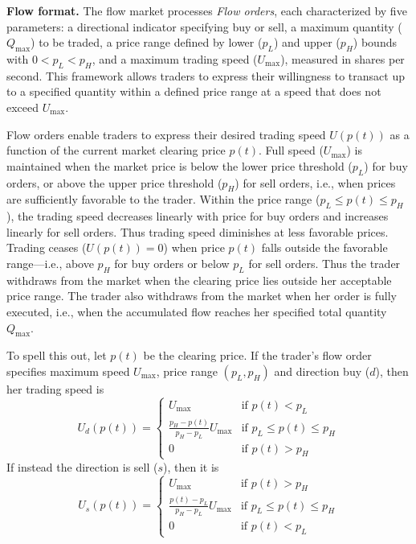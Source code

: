 \documentclass[12pt]{article}
\begin{document}
\bigskip
\noindent
\textbf{Flow format.}
The flow market processes  \textit{Flow orders}, %
each characterized by five parameters: a directional indicator specifying buy or sell, a maximum quantity (\(Q_{\max}\)) to be traded, a price range defined by lower (\(p_L\)) and upper (\(p_H\)) bounds with \(0<p_L < p_H\), and a maximum trading speed (\(U_{\max}\)), measured in shares per second. This framework allows traders to express their willingness to transact up to a specified quantity within a defined price range at a speed that does not exceed \(U_{\max}\).

Flow orders enable traders to express their desired trading speed \(U(p(t))\)  as a function of the current market clearing price \(p(t)\). 
Full speed (\(U_{\max}\)) is maintained when the market price is below the lower price threshold (\(p_L\)) for buy orders, or above the upper price threshold (\(p_H\)) for sell orders, i.e., when prices are sufficiently favorable to the trader.
Within the price range (\(p_L \leq p(t) \leq p_H\)), the trading speed decreases linearly with price for buy orders and increases linearly for sell orders. Thus trading speed diminishes at less favorable prices. 
Trading ceases (\(U(p(t)) = 0\)) when price $p(t)$ falls outside the favorable range—i.e., above \(p_H\) for buy orders or below \(p_L\) for sell orders. Thus the trader withdraws from the market when the clearing price lies outside her acceptable price range. 
The trader also withdraws from the market when her order is fully executed, i.e., when the accumulated flow reaches her specified total quantity \(Q_{\max}\).

To spell this out, let $p(t)$ be the clearing price. If the trader's flow order specifies maximum speed $U_{\max}$, price range $(p_L , p_H)$ and direction buy ($d$), then her trading speed is
\begin{equation}\label{eq:flowd}
U_{d}(p(t)) = \begin{cases}
U_{\max} & \text{if } p(t) < p_L \\
\frac{p_H - p(t)}{p_H - p_L} U_{\max} & \text{if } p_L \leq p(t) \leq p_H \\
0 & \text{if } p(t) > p_H
\end{cases}
\end{equation}
If instead the direction is sell ($s$),
then it is
\begin{equation}\label{eq:Flow60}
U_s(p(t)) = \begin{cases}
	U_{\max} & \text{if } p(t) > p_H\\
	\frac{p(t) - p_L}{p_H - p_L} U_{\max} & \text{if } p_L \leq p(t) \leq p_H \\
	0 & \text{if } p(t) < p_L 
\end{cases}
\end{equation}
\end{document}
